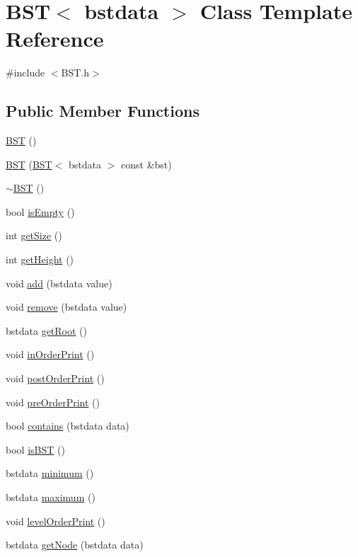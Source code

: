 \hypertarget{class_b_s_t}{}\section{B\+S\+T$<$ bstdata $>$ Class Template Reference}
\label{class_b_s_t}


{\ttfamily \#include $<$B\+S\+T.\+h$>$}

\subsection*{Public Member Functions}
\begin{DoxyCompactItemize}
\item 
\hyperlink{class_b_s_t_a735f2e14e53f4fba3940ce547213cf93}{B\+S\+T} ()
\item 
\hyperlink{class_b_s_t_a5d3b6579e87f47d2a773c3e514051c77}{B\+S\+T} (\hyperlink{class_b_s_t}{B\+S\+T}$<$ bstdata $>$ const \&bst)
\item 
\hyperlink{class_b_s_t_a34395c7dc7e47d312933951b2781cebb}{$\sim$\+B\+S\+T} ()
\item 
bool \hyperlink{class_b_s_t_aaf5701521d37dfb3a6ecc3563ab77fbf}{is\+Empty} ()
\item 
int \hyperlink{class_b_s_t_a507229baa5487c690e191a26ab1550de}{get\+Size} ()
\item 
int \hyperlink{class_b_s_t_a7cda998300ca68d2f70c647b964557bb}{get\+Height} ()
\item 
void \hyperlink{class_b_s_t_a55951a848cb22cb4a688b593b74f5103}{add} (bstdata value)
\item 
void \hyperlink{class_b_s_t_a66b09c3fbfacaa49145a510084a10aad}{remove} (bstdata value)
\item 
bstdata \hyperlink{class_b_s_t_a13590f0c072f798933deb57de7b25aad}{get\+Root} ()
\item 
void \hyperlink{class_b_s_t_a48f0ed03952ff9abad62a3cc7860c8ed}{in\+Order\+Print} ()
\item 
void \hyperlink{class_b_s_t_a9d6c671d711952c10efbd5ec15bfddb3}{post\+Order\+Print} ()
\item 
void \hyperlink{class_b_s_t_afaef8b47def700287599da5e1ed2c1ba}{pre\+Order\+Print} ()
\item 
bool \hyperlink{class_b_s_t_aa948f8978ea39ed68aaa47b57ad9dc54}{contains} (bstdata data)
\item 
bool \hyperlink{class_b_s_t_ad894d7205a1d489be7c22d2593e6ab43}{is\+B\+S\+T} ()
\item 
bstdata \hyperlink{class_b_s_t_ab3235327cc85e256b688b9cf0fd5be98}{minimum} ()
\item 
bstdata \hyperlink{class_b_s_t_a6a0e04e302ba0626368aed277d5718e8}{maximum} ()
\item 
void \hyperlink{class_b_s_t_aac47eb2f7bd78faec46e7fa71b123bba}{level\+Order\+Print} ()
\item 
bstdata \hyperlink{class_b_s_t_ad6d3f0c4417e91f72a6c4b09c17479d3}{get\+Node} (bstdata data)
\end{DoxyCompactItemize}


